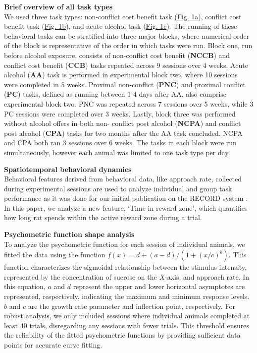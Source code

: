 \documentclass{article}
\begin{document}
\vspace{1em}

\noindent\textbf{Brief overview of all task types}\\
We used three task types: non-conflict cost benefit task (\hyperref[fig:alcohol_main_1]{Fig. 1a}), conflict cost benefit task (\hyperref[fig:alcohol_main_1]{Fig. 1b}), and acute alcohol task (\hyperref[fig:alcohol_main_1]{Fig. 1c}). The running of these behavioral tasks can be stratified into three major blocks, where numerical order of the block is representative of the order in which tasks were run. Block one, run before alcohol exposure, consists of non-conflict cost benefit (\textbf{NCCB}) and conflict cost benefit (\textbf{CCB}) tasks repeated across 9 sessions over 4 weeks. Acute alcohol (\textbf{AA}) task is performed in experimental block two, where 10 sessions were completed in 5 weeks. Proximal non-conflict (\textbf{PNC}) and proximal conflict (\textbf{PC}) tasks, defined as running between 1-4 days after AA, also comprise experimental block two. PNC was repeated across 7 sessions over 5 weeks, while 3 PC sessions were completed over 3 weeks. Lastly, block three was performed without alcohol offers in both non- conflict post alcohol (\textbf{NCPA}) and conflict post alcohol (\textbf{CPA}) tasks for two months after the AA task concluded. NCPA and CPA both ran 3 sessions over 6 weeks. The tasks in each block were run simultaneously, however each animal was limited to one task type per day.

\vspace{1em}

\noindent\textbf{Spatiotemporal behavioral dynamics}\\
Behavioral features derived from behavioral data, like approach rate, collected during experimental sessions are used to analyze individual and group task performance as it was done for our initial publication on the RECORD system \cite{ibanez2024record}. In this paper, we analyze a new feature, ‘Time in reward zone’, which quantifies how long rat spends within the active reward zone during a trial.

\vspace{1em}

\noindent\textbf{Psychometric function shape analysis}\\
To analyze the psychometric function for each session of individual animals, we fitted the data using the function $f(x) = d+(a-d)/(1+(x/c)^b)$. This function characterizes the sigmoidal relationship between the stimulus intensity, represented by the concentration of sucrose on the $X$-axis, and approach rate. In this equation, $a$ and $d$ represent the upper and lower horizontal asymptotes are represented, respectively, indicating the maximum and minimum response levels. $b$ and $c$ are the growth rate parameter and inflection point, respectively. For robust analysis, we only included sessions where individual animals completed at least 40 trials, disregarding any sessions with fewer trials. This threshold ensures the reliability of the fitted psychometric functions by providing sufficient data points for accurate curve fitting. 
\end{document}
